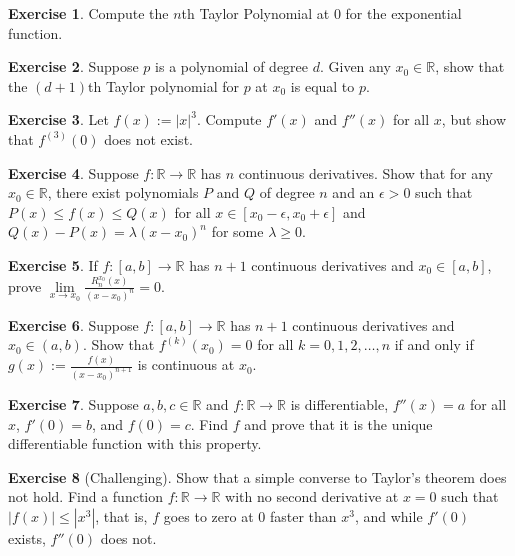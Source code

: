 \documentclass[12pt]{book}
\newcommand{\abs}[1]{\left\lvert {#1} \right\rvert}
\newcommand{\R}{{\mathbb{R}}}
\theoremstyle{plain}
\theoremstyle{remark}
\theoremstyle{definition}
\theoremstyle{exercise}
\newtheorem{exercise}{Exercise}[section]
\theoremstyle{example}
\begin{document}
\begin{exercise}
Compute the $n$th Taylor Polynomial at $0$ for the exponential function.
\end{exercise}

\begin{exercise}
Suppose $p$ is a polynomial of degree $d$.  Given any $x_0 \in \R$,
show that
the $(d+1)$th Taylor polynomial for $p$ at $x_0$ is equal to $p$.
\end{exercise}

\begin{exercise}
Let $f(x) := \abs{x}^3$.  Compute $f'(x)$ and $f''(x)$ for all $x$,
but show that $f^{(3)}(0)$ does not exist.
\end{exercise}

\begin{exercise}
Suppose $f \colon \R \to \R$ has $n$ continuous derivatives.  Show
that for any $x_0 \in \R$,
there exist polynomials $P$ and $Q$ of degree $n$ and 
an $\epsilon > 0$ such that $P(x) \leq f(x) \leq Q(x)$ for all $x \in
[x_0-\epsilon,x_0+\epsilon]$  and
$Q(x)-P(x) = \lambda {(x-x_0)}^n$ for some $\lambda \geq 0$.
\end{exercise}

\begin{exercise}
If $f \colon [a,b] \to \R$ has $n+1$ continuous derivatives
and $x_0 \in [a,b]$,
prove
$\lim\limits_{x\to x_0} \frac{R_n^{x_0}(x)}{{(x-x_0)}^n} = 0$.
\end{exercise}

\begin{exercise}
Suppose $f \colon [a,b] \to \R$ has $n+1$ continuous derivatives
and $x_0 \in (a,b)$.
Show that $f^{(k)}(x_0) = 0$ for all $k = 0, 1, 2, \ldots, n$
if and only if $g(x) := \frac{f(x)}{{(x-x_0)}^{n+1}}$ is continuous at $x_0$.
\end{exercise}

\begin{exercise}
Suppose $a,b,c \in \R$ and $f \colon \R \to \R$ is differentiable,
$f''(x) = a$ for all $x$, $f'(0) = b$, and $f(0) = c$.  Find $f$ and prove that 
it is the unique differentiable function with this property.
\end{exercise}

\begin{exercise}[Challenging]
Show that a simple converse to Taylor's theorem does not hold.
Find a function $f \colon \R \to \R$ with no second derivative at $x=0$ such that
$\abs{f(x)} \leq \abs{x^3}$, that is, $f$ goes to zero at 0 faster than $x^3$, and
while $f'(0)$ exists, $f''(0)$ does not.
\end{exercise}
\end{document}
